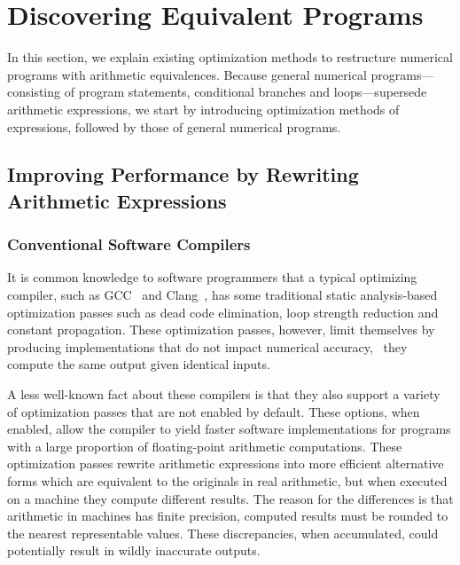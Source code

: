 \section{Discovering Equivalent Programs}
\label{bg:sec:discovering_equivalent_programs}

In this section, we explain existing optimization methods to restructure
numerical programs with arithmetic equivalences.  Because general numerical
programs---consisting of program statements, conditional branches and
loops---supersede arithmetic expressions, we start by introducing optimization
methods of expressions, followed by those of general numerical programs.


\subsection{Improving Performance by Rewriting Arithmetic Expressions}
\label{bg:sub:arithmetic_expressions}

\subsubsection{Conventional Software Compilers}

It is common knowledge to software programmers that a typical optimizing
compiler, such as GCC~\cite{gcc} and Clang~\cite{clang}, has some traditional
static analysis-based optimization passes such as dead code elimination, loop
strength reduction and constant propagation.  These optimization passes,
however, limit themselves by producing implementations that do not impact
numerical accuracy, \ie~they compute the same output given identical inputs.

A less well-known fact about these compilers is that they also support a
variety of optimization passes that are not enabled by default.  These options,
when enabled, allow the compiler to yield faster software implementations for
programs with a large proportion of floating-point arithmetic computations.
These optimization passes rewrite arithmetic expressions into more efficient
alternative forms which are equivalent to the originals in real arithmetic,
but when executed on a machine they compute different results.  The reason
for the differences is that arithmetic in machines has finite precision,
computed results must be rounded to the nearest representable values.  These
discrepancies, when accumulated, could potentially result in wildly inaccurate
outputs.

